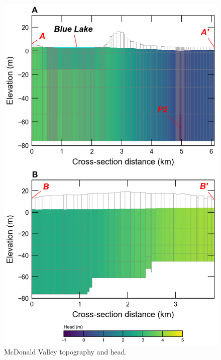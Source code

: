 \documentclass[11pt, oneside]{article}  	%
\begin{document}
\begin{figure}[ht!]
	\begin{center}
		\includegraphics{figures/mv_voronoi_xsection.png}
	\end{center}
	\caption{McDonald Valley topography and head.}
	\label{fig:mvxsection}
\end{figure}

\end{document}
